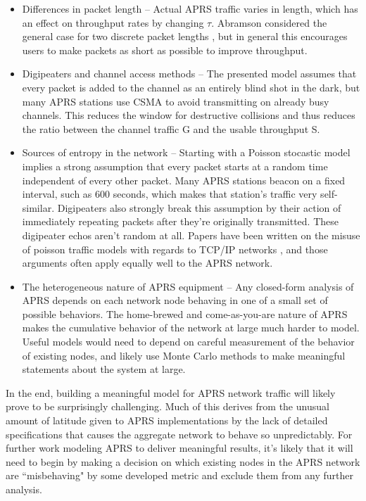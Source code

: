 \begin{itemize}
	\item Differences in packet length -- Actual APRS traffic varies in length,
		which has an effect on throughput rates by changing $\tau$.
		Abramson considered the general
		case for two discrete packet lengths \cite{packetthroughput},
		but in general this encourages users to make packets as short as possible
		to improve throughput.
	\item Digipeaters and channel access methods -- The presented model assumes that
		every packet is added to the channel as an entirely blind shot in the dark,
		but many APRS stations use CSMA to avoid transmitting on already busy channels.
		This reduces the window for destructive collisions and thus reduces the ratio
		between the channel traffic G and the usable throughput S.
	\item Sources of entropy in the network -- Starting with a Poisson stocastic model
		implies a strong assumption that every packet starts at a random time independent
		of every other packet. Many APRS stations beacon on a fixed interval,
		such as 600 seconds, which makes that station's traffic very self-similar.
		Digipeaters also strongly break this assumption by their action of immediately
		repeating packets after they're originally transmitted.
		These digipeater echos aren't random at all.
		Papers have been written on the misuse of poisson traffic models with regards
		to TCP/IP networks \cite{failureofpoisson}, and those arguments often apply
		equally well to the APRS network.
	\item The heterogeneous nature of APRS equipment -- Any closed-form analysis
		of APRS depends on each network node behaving in one of a small set 
		of possible behaviors. The home-brewed and come-as-you-are nature of APRS
		makes the cumulative behavior of the network at large much harder to model.
		Useful models would need to depend on careful measurement of the behavior of
		existing nodes, and likely use Monte Carlo methods to make meaningful
		statements about the system at large.
\end{itemize}

In the end, building a meaningful model for APRS network traffic will likely prove
to be surprisingly challenging.
Much of this derives from the unusual amount of latitude given to APRS implementations
by the lack of detailed specifications that causes the aggregate network to behave so
unpredictably.
For further work modeling APRS to deliver meaningful results,
it's likely that it will need to begin by making a decision on which existing nodes in the
APRS network are ``misbehaving" by some developed metric and exclude them from
any further analysis.

